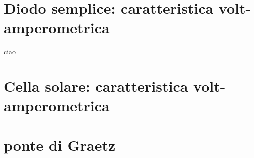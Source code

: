 \section{Diodo semplice: caratteristica volt-amperometrica}

ciao

\section{Cella solare: caratteristica volt-amperometrica}

\section{ponte di Graetz}